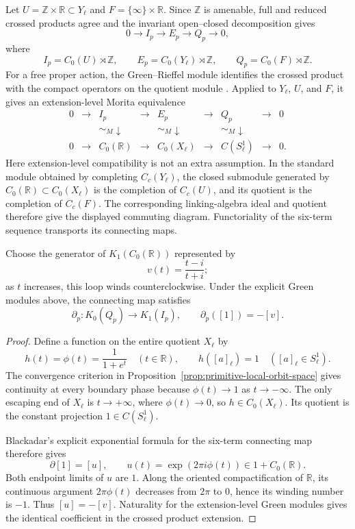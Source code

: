 Let $U=\mathbb Z\times\mathbb R\subset Y_\ell$ and
$F=\{\infty\}\times\mathbb R$.  Since $\mathbb Z$ is amenable, full and
reduced crossed products agree and the invariant open--closed decomposition
gives
\[
 0\longrightarrow I_p\longrightarrow E_p\longrightarrow Q_p\longrightarrow0,
\]
where
\[
 I_p=C_0(U)\rtimes\mathbb Z,\qquad
 E_p=C_0(Y_\ell)\rtimes\mathbb Z,\qquad
 Q_p=C_0(F)\rtimes\mathbb Z.
\]
For a free proper action, the Green--Rieffel module identifies the crossed
product with the compact operators on the quotient module
\cite[Theorem~1.3.22]{meslandSengun2025}.  Applied to $Y_\ell$, $U$, and $F$,
it gives an extension-level Morita equivalence
\[
\begin{array}{ccccccccc}
0&\to&I_p&\to&E_p&\to&Q_p&\to&0\\
 &&\sim_M\downarrow&&\sim_M\downarrow&&\sim_M\downarrow\\
0&\to&C_0(\mathbb R)&\to&C_0(X_\ell)&\to&C(S^1_\ell)&\to&0.
\end{array}
\]
Here extension-level compatibility is not an extra assumption.  In the
standard module obtained by completing $C_c(Y_\ell)$, the closed submodule
generated by $C_0(\mathbb R)\subset C_0(X_\ell)$ is the completion of
$C_c(U)$, and its quotient is the completion of $C_c(F)$.  The corresponding
linking-algebra ideal and quotient therefore give the displayed commuting
diagram.  Functoriality of the six-term sequence transports its connecting
maps.

\begin{theorem}
\label{thm:primitive-local-boundary}
Choose the generator of $K_1(C_0(\mathbb R))$ represented by
\[
 v(t)=\frac{t-i}{t+i};
\]
as $t$ increases, this loop winds counterclockwise.  Under the explicit Green
modules above, the connecting map satisfies
\[
 \partial_p:K_0(Q_p)\longrightarrow K_1(I_p),
 \qquad \partial_p([1])=-[v].
\]
\end{theorem}

\begin{proof}
Define a function on the entire quotient $X_\ell$ by
\[
 h(t)=\phi(t)=\frac{1}{1+e^t}\quad(t\in\mathbb R),
 \qquad h([a]_\ell)=1\quad([a]_\ell\in S^1_\ell).
\]
The convergence criterion in Proposition~\ref{prop:primitive-local-orbit-space}
gives continuity at every boundary phase because $\phi(t)\to1$ as
$t\to-\infty$.  The only escaping end of $X_\ell$ is $t\to+\infty$, where
$\phi(t)\to0$, so $h\in C_0(X_\ell)$.  Its quotient is the constant projection
$1\in C(S^1_\ell)$.

Blackadar's explicit exponential formula for the six-term connecting map
\cite[Section~9.3.2]{blackadar1986} therefore gives
\[
 \partial[1]=[u],\qquad
 u(t)=\exp\!\left(2\pi i\phi(t)\right)\in 1+C_0(\mathbb R).
\]
Both endpoint limits of $u$ are $1$.  Along the oriented compactification of
$\mathbb R$, its continuous argument $2\pi\phi(t)$ decreases from $2\pi$ to
$0$, hence its winding number is $-1$.  Thus $[u]=-[v]$.  Naturality for the
extension-level Green modules gives the identical coefficient in the crossed
product extension.
\end{proof}

